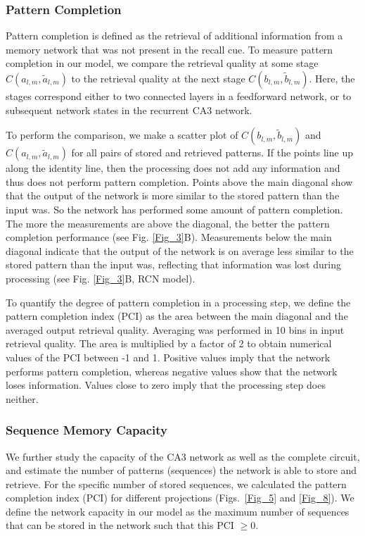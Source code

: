 \documentclass[utf8]{frontiersSCNS} %
\begin{document}
\subsubsection{Pattern Completion}
Pattern completion is defined as the retrieval of additional information from a memory network that was not present in the recall cue. To measure pattern completion in our model, we compare the retrieval quality at some stage $C(a_{l, m},\tilde{a}_{l, m})$ to the retrieval quality at the next stage $C(b_{l, m},\tilde{b}_{l, m})$. Here, the stages correspond either to two connected layers in a feedforward network, or to subsequent network states in the recurrent CA3 network. 

%
To perform the comparison, we make a scatter plot of
$C(b_{l, m},\tilde{b}_{l, m})$ and
$C(a_{l, m},\tilde{a}_{l, m})$ 
for all pairs of stored and retrieved patterns.
If the points line up along the identity line, then the processing does not add any information and thus does not perform pattern completion. Points above the main diagonal show that the output of the network is more similar to the stored pattern than the input was. So the network has performed some amount of pattern completion. The more the measurements are above the diagonal, the better the pattern completion performance (see Fig. \ref{Fig_3}B). Measurements below the main diagonal indicate that the output of the network is on average less similar to the stored pattern than the input was, reflecting that information was lost during processing (see Fig. \ref{Fig_3}B, RCN model).

To quantify the degree of pattern completion in a processing step, we define the pattern completion index (PCI) as the area between the main diagonal and the averaged output retrieval quality. Averaging was performed in 10 bins in input retrieval quality. The area is multiplied by a factor of 2 to obtain numerical values of the PCI between -1 and 1. Positive values imply that the network performs pattern completion, whereas negative values show that the network loses information. Values close to zero imply that the processing step does neither. 

\subsubsection{Sequence Memory Capacity}

We further study the capacity of the CA3 network as well as the complete circuit, and estimate the number of patterns (sequences) the network is able to store and retrieve. For the specific number of stored sequences, we calculated the pattern completion index (PCI) for different projections (Figs.~\ref{Fig_5} and \ref{Fig_8}). 
We define the network capacity in our model as the maximum number of sequences that can be stored in the network such that this PCI $\geq 0$.
\end{document}
